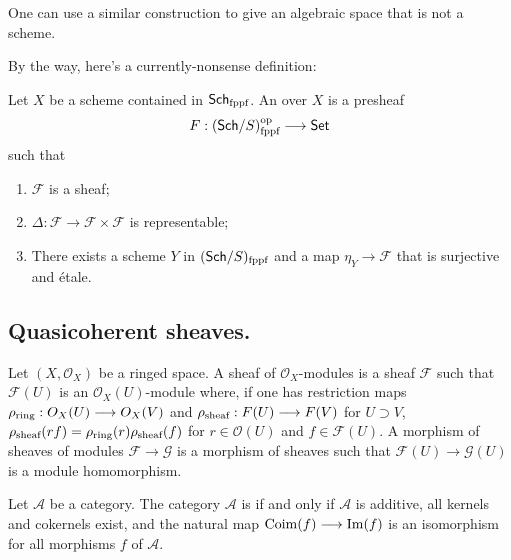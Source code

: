 \documentclass [11 pt, oneside] {article}
\begin{document}
\begin{remark}
	One can use a similar construction to give an algebraic space that is not a scheme.
	
	By the way, here's a currently-nonsense definition:

	Let $X$ be a scheme contained in $\catn{Sch}\textsubscript{fppf}$. An  over $X$ is a presheaf
	\begin{align*}
		\mathscr{F}: (\catn{Sch}/S)_{\textrm{fppf}}^{\textrm{op}}\longrightarrow \catn{Set}
	\end{align*}
	such that
	\begin{enumerate}
		\item $\mathscr{F}$ is a sheaf;
		\item $\Delta : \mathscr{F}\longrightarrow \mathscr{F}\times \mathscr{F}$ is representable;
		\item There exists a scheme $Y$ in $(\catn{Sch}/S)\textsubscript{fppf}$ and a map $\eta_Y \longrightarrow \mathscr{F}$ that is surjective and \'etale. 
	\end{enumerate}
\end{remark}

\subsection{Quasicoherent sheaves.}

Let $(X,\mathscr{O}_X)$ be a ringed space. A sheaf of $\mathscr{O}_X$-modules is a sheaf $\mathscr{F}$ such that $\mathscr{F}(U)$ is an $\mathscr{O}_X(U)$-module where, if one has restriction maps $\rho\textsubscript{ring} : \mathscr{O}_X(U) \longrightarrow \mathscr{O}_X(V)$ and $\rho\textsubscript{sheaf} : \mathscr{F}(U)\longrightarrow \mathscr{F}(V)$ for $U\supset V$, $\rho\textsubscript{sheaf}(rf)=\rho\textsubscript{ring} (r) \rho\textsubscript{sheaf}(f)$ for $r\in \mathscr{O}(U)$ and $f\in \mathscr{F}(U)$. A morphism of sheaves of modules $\mathscr{F}\longrightarrow \mathscr{G}$ is a morphism of sheaves such that $\mathscr{F}(U) \longrightarrow \mathscr{G}(U)$ is a module homomorphism.

 \begin{definition}\label{}\text{}
Let $\mathscr{A}$ be a category. The category $\mathscr{A}$ is  if and only if $\mathscr{A}$ is additive, all kernels and cokernels exist, and the natural map $\Coim(f) \longrightarrow \Img(f)$ is an isomorphism for all morphisms $f$ of $\mathscr{A}$.
\end{definition}
\end{document}
